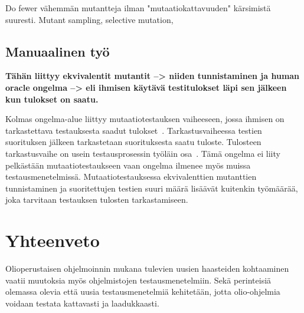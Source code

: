 \documentclass[finnish, grading]{tktltiki2}
\theoremstyle{definition}
\theoremstyle{remark}
\begin{document}
Do fewer vähemmän mutantteja ilman "mutaatiokattavuuden" kärsimistä suuresti. Mutant sampling, selective mutation, 

\subsection{Manuaalinen työ}

\textbf{Tähän liittyy ekvivalentit mutantit --> niiden tunnistaminen ja human oracle ongelma --> eli ihmisen käytävä testitulokset läpi sen jälkeen kun tulokset on saatu.}

Kolmas ongelma-alue liittyy mutaatiotestauksen vaiheeseen, jossa ihmisen on tarkastettava testauksesta saadut tulokset~\cite[s. 652]{Jia:Harman:2011}. Tarkastusvaiheessa testien suorituksen jälkeen tarkastetaan suorituksesta saatu tuloste. Tulosteen tarkastusvaihe on usein testausprosessin työläin osa~\cite[s. 653]{Jia:Harman:2011}. Tämä ongelma ei liity pelkästään mutaatiotestaukseen vaan ongelma ilmenee myös muissa testausmenetelmissä. Mutaatiotestauksessa ekvivalenttien mutanttien tunnistaminen ja suoritettujen testien suuri määrä lisäävät kuitenkin työmäärää, joka tarvitaan testauksen tulosten tarkastamiseen.







\section{Yhteenveto}

Olioperustaisen ohjelmoinnin mukana tulevien uusien haasteiden kohtaaminen vaatii muutoksia myös ohjelmistojen testausmenetelmiin. Sekä perinteisiä olemassa olevia että uusia testausmenetelmiä kehitetään, jotta olio-ohjelmia voidaan testata kattavasti ja laadukkaasti. 
\end{document}
